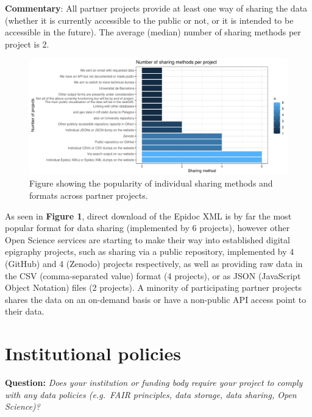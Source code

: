 \documentclass[
  12pt,
]{scrreprt}
\begin{document}
\normalsize

\textbf{Commentary}: All partner projects provide at least one way of
sharing the data (whether it is currently accessible to the public or
not, or it is intended to be accessible in the future). The average
(median) number of sharing methods per project is 2.

\footnotesize

\begin{figure}

{\centering \includegraphics{01_FAIR_epi_report_files/figure-latex/fig1-1} 

}

\caption{Figure showing the popularity of individual sharing methods and formats across partner projects.}\label{fig:fig1}
\end{figure}

\normalsize

As seen in \textbf{Figure 1}, direct download of the Epidoc XML is by
far the most popular format for data sharing (implemented by 6
projects), however other Open Science services are starting to make
their way into established digital epigraphy projects, such as sharing
via a public repository, implemented by 4 (GitHub) and 4 (Zenodo)
projects respectively, as well as providing raw data in the CSV
(comma-separated value) format (4 projects), or as JSON (JavaScript
Object Notation) files (2 projects). A minority of participating partner
projects shares the data on an on-demand basis or have a non-public API
access point to their data.

\hypertarget{institutional-policies}{%
\section{Institutional policies}\label{institutional-policies}}

\textbf{Question:} \emph{Does your institution or funding body require
your project to comply with any data policies (e.g.~FAIR principles,
data storage, data sharing, Open Science)?}
\end{document}
